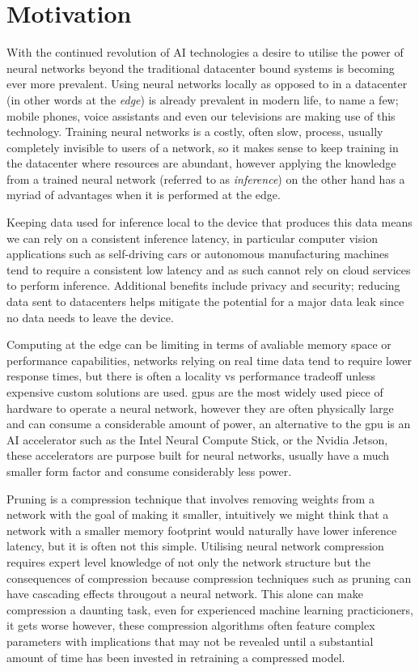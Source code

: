 \documentclass[../Dissertation.tex]{subfiles}
\begin{document}
\section{Motivation}
With the continued revolution of AI technologies a desire to utilise the power of neural networks beyond the traditional datacenter bound systems is becoming ever more prevalent.
Using neural networks locally as opposed to in a datacenter (in other words at the \emph{edge}) is already prevalent in modern life, to name a few; mobile phones, voice assistants and even our televisions are making use of this technology. 
Training neural networks is a costly, often slow, process, usually completely invisible to users of a network, so it makes sense to keep training in the datacenter where resources are abundant, however applying the knowledge from a trained neural network (referred to as \emph{inference}) on the other hand has a myriad of advantages when it is performed at the edge.

Keeping data used for inference local to the device that produces this data means we can rely on a consistent inference latency, in particular computer vision applications such as self-driving cars or autonomous manufacturing machines tend to require a consistent low latency and as such cannot rely on cloud services to perform inference. 
Additional benefits include privacy and security; reducing data sent to datacenters helps mitigate the potential for a major data leak since no data needs to leave the device.

Computing at the edge can be limiting in terms of avaliable memory space or performance capabilities, networks relying on real time data tend to require lower response times, but there is often a locality vs performance tradeoff unless expensive custom solutions are used.
\acrshort{gpu}s are the most widely used piece of hardware to operate a neural network, however they are often physically large and can consume a considerable amount of power, an alternative to the \acrshort{gpu} is an AI accelerator such as the Intel Neural Compute Stick, or the Nvidia Jetson, these accelerators are purpose built for neural networks, usually have a much smaller form factor and consume considerably less power.

Pruning is a compression technique that involves removing weights from a network with the goal of making it smaller, intuitively we might think that a network with a smaller memory footprint would naturally have lower inference latency, but it is often not this simple.
Utilising neural network compression requires expert level knowledge of not only the network structure but the consequences of compression because compression techniques such as pruning can have cascading effects througout a neural network.
This alone can make compression a daunting task, even for experienced machine learning practicioners, it gets worse however, these compression algorithms often feature complex parameters with implications that may not be revealed until a substantial amount of time has been invested in retraining a compressed model.
\end{document}
